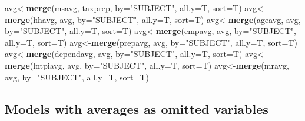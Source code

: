 \documentclass[]{book}
\newenvironment{Shaded}{\begin{snugshade}}{\end{snugshade}}
\newcommand{\DataTypeTok}[1]{\textcolor[rgb]{0.13,0.29,0.53}{#1}}
\newcommand{\KeywordTok}[1]{\textcolor[rgb]{0.13,0.29,0.53}{\textbf{#1}}}
\newcommand{\NormalTok}[1]{#1}
\newcommand{\StringTok}[1]{\textcolor[rgb]{0.31,0.60,0.02}{#1}}
\begin{document}
\begin{Shaded}
\begin{Highlighting}[]
\NormalTok{avg<-}\KeywordTok{merge}\NormalTok{(msavg, taxprep, }\DataTypeTok{by=}\StringTok{"SUBJECT"}\NormalTok{, }\DataTypeTok{all.y=}\NormalTok{T, }\DataTypeTok{sort=}\NormalTok{T)}
\NormalTok{avg<-}\KeywordTok{merge}\NormalTok{(hhavg, avg, }\DataTypeTok{by=}\StringTok{"SUBJECT"}\NormalTok{, }\DataTypeTok{all.y=}\NormalTok{T, }\DataTypeTok{sort=}\NormalTok{T)}
\NormalTok{avg<-}\KeywordTok{merge}\NormalTok{(ageavg, avg, }\DataTypeTok{by=}\StringTok{"SUBJECT"}\NormalTok{, }\DataTypeTok{all.y=}\NormalTok{T, }\DataTypeTok{sort=}\NormalTok{T)}
\NormalTok{avg<-}\KeywordTok{merge}\NormalTok{(empavg, avg, }\DataTypeTok{by=}\StringTok{"SUBJECT"}\NormalTok{, }\DataTypeTok{all.y=}\NormalTok{T, }\DataTypeTok{sort=}\NormalTok{T)}
\NormalTok{avg<-}\KeywordTok{merge}\NormalTok{(prepavg, avg, }\DataTypeTok{by=}\StringTok{"SUBJECT"}\NormalTok{, }\DataTypeTok{all.y=}\NormalTok{T, }\DataTypeTok{sort=}\NormalTok{T)}
\NormalTok{avg<-}\KeywordTok{merge}\NormalTok{(dependavg, avg, }\DataTypeTok{by=}\StringTok{"SUBJECT"}\NormalTok{, }\DataTypeTok{all.y=}\NormalTok{T, }\DataTypeTok{sort=}\NormalTok{T)}
\NormalTok{avg<-}\KeywordTok{merge}\NormalTok{(lntpiavg, avg, }\DataTypeTok{by=}\StringTok{"SUBJECT"}\NormalTok{, }\DataTypeTok{all.y=}\NormalTok{T, }\DataTypeTok{sort=}\NormalTok{T)}
\NormalTok{avg<-}\KeywordTok{merge}\NormalTok{(mravg, avg, }\DataTypeTok{by=}\StringTok{"SUBJECT"}\NormalTok{, }\DataTypeTok{all.y=}\NormalTok{T, }\DataTypeTok{sort=}\NormalTok{T)}
\end{Highlighting}
\end{Shaded}

\hypertarget{models-with-averages-as-omitted-variables}{%
\subsection{Models with averages as omitted variables}\label{models-with-averages-as-omitted-variables}}
\end{document}
